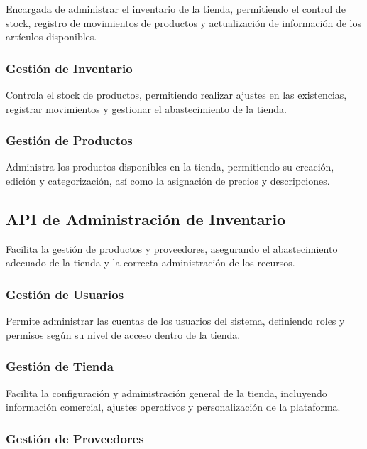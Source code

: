 Encargada de administrar el inventario de la tienda, permitiendo el control de stock, registro de movimientos de productos y 
actualización de información de los artículos disponibles.

\subsubsection{Gestión de Inventario}

Controla el stock de productos, permitiendo realizar ajustes en las existencias, registrar 
movimientos y gestionar el abastecimiento de la tienda.

\subsubsection{Gestión de Productos}

Administra los productos disponibles en la tienda, permitiendo su creación, edición y 
categorización, así como la asignación de precios y descripciones.

\subsection{API de Administración de Inventario}

Facilita la gestión de productos y proveedores, asegurando el abastecimiento adecuado de la tienda y la correcta administración 
de los recursos.

\subsubsection{Gestión de Usuarios}

Permite administrar las cuentas de los usuarios del sistema, definiendo roles 
y permisos según su nivel de acceso dentro de la tienda.

\subsubsection{Gestión de Tienda}

Facilita la configuración y administración general de la tienda, incluyendo 
información comercial, ajustes operativos y personalización de la plataforma.

\subsubsection{Gestión de Proveedores}

